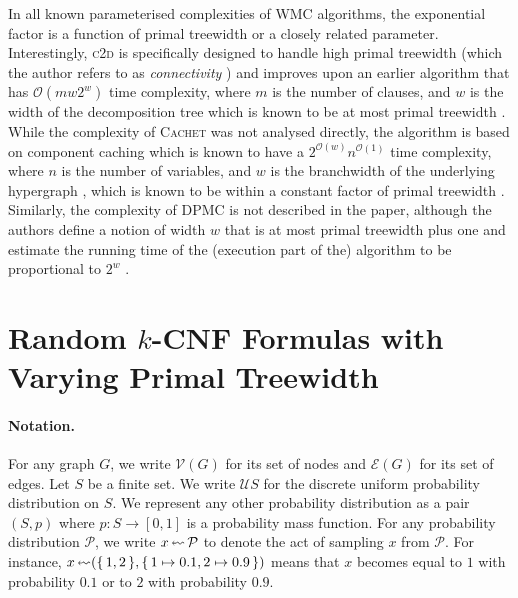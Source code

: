 In all known parameterised complexities of \textsf{WMC} algorithms, the
exponential factor is a function of primal treewidth or a closely related
parameter. Interestingly, \textsc{c2d} is specifically designed to handle high
primal treewidth (which the author refers to as
\emph{connectivity} \citep{DBLP:conf/ijcai/Darwiche99}) and improves upon an
earlier algorithm that has $\mathcal{O}(mw2^w)$ time complexity, where $m$ is
the number of clauses, and $w$ is the width of the decomposition tree which is
known to be at most primal
treewidth \citep{DBLP:journals/jacm/Darwiche01,DBLP:conf/ecai/Darwiche04}. While
the complexity of \textsc{Cachet} was not analysed directly, the algorithm is
based on component caching which is known to have a
$2^{\mathcal{O}(w)}n^{\mathcal{O}(1)}$ time complexity, where $n$ is the number
of variables, and $w$ is the branchwidth of the underlying
hypergraph \citep{DBLP:journals/jair/BacchusDP09,DBLP:conf/sat/SangBBKP04}, which
is known to be within a constant factor of primal
treewidth \citep{DBLP:journals/jct/RobertsonS91}. Similarly, the complexity of
\textsf{DPMC} is not described in the paper, although the authors define a
notion of width $w$ that is at most primal treewidth plus one and estimate the
running time of the (execution part of the) algorithm to be proportional to
$2^w$ \citep{DBLP:conf/cp/DudekPV20}.

\section{Random $k$-CNF Formulas with Varying Primal
  Treewidth}\label{sec:model}

\paragraph*{Notation.}
For any graph $G$, we write $\mathcal{V}(G)$ for its set of nodes and
$\mathcal{E}(G)$ for its set of edges. Let $S$ be a finite set. We write
$\mathcal{U}S$ for the discrete uniform probability distribution on $S$. We
represent any other probability distribution as a pair $(S, p)$ where $p\colon S
\to [0, 1]$ is a probability mass function. For any probability distribution
$\mathcal{P}$, we write $x \leftlsquigarrow \mathcal{P}$ to denote the act of
sampling $x$ from $\mathcal{P}$. For instance, $x \leftlsquigarrow (\{\, 1, 2 \,\}, \{\, 1 \mapsto 0.1, 2 \mapsto 0.9 \,\})$ means that $x$ becomes equal to $1$ with probability $0.1$ or to $2$ with probability $0.9$.

